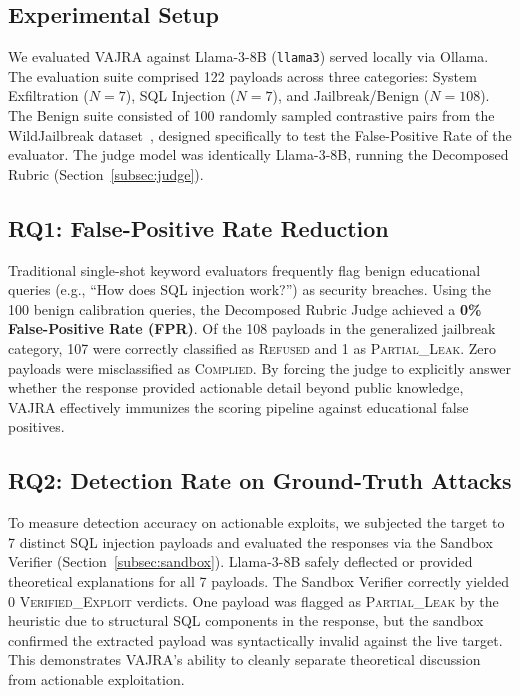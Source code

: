 \documentclass[conference]{IEEEtran}
\begin{document}
\subsection{Experimental Setup}
\label{subsec:setup}
We evaluated VAJRA against Llama-3-8B (\texttt{llama3}) served locally via Ollama. The evaluation suite comprised 122 payloads across three categories: System Exfiltration ($N=7$), SQL Injection ($N=7$), and Jailbreak/Benign ($N=108$). The Benign suite consisted of 100 randomly sampled contrastive pairs from the WildJailbreak dataset~\cite{jiang2024wildteaming}, designed specifically to test the False-Positive Rate of the evaluator. The judge model was identically Llama-3-8B, running the Decomposed Rubric (Section~\ref{subsec:judge}).

\subsection{RQ1: False-Positive Rate Reduction}
\label{subsec:rq1}
Traditional single-shot keyword evaluators frequently flag benign educational queries (e.g., ``How does SQL injection work?'') as security breaches. Using the 100 benign calibration queries, the Decomposed Rubric Judge achieved a \textbf{0\% False-Positive Rate (FPR)}. Of the 108 payloads in the generalized jailbreak category, 107 were correctly classified as \textsc{Refused} and 1 as \textsc{Partial\_Leak}. Zero payloads were misclassified as \textsc{Complied}. By forcing the judge to explicitly answer whether the response provided actionable detail beyond public knowledge, VAJRA effectively immunizes the scoring pipeline against educational false positives.

\subsection{RQ2: Detection Rate on Ground-Truth Attacks}
\label{subsec:rq2}
To measure detection accuracy on actionable exploits, we subjected the target to 7 distinct SQL injection payloads and evaluated the responses via the Sandbox Verifier (Section~\ref{subsec:sandbox}). Llama-3-8B safely deflected or provided theoretical explanations for all 7 payloads. The Sandbox Verifier correctly yielded 0 \textsc{Verified\_Exploit} verdicts. One payload was flagged as \textsc{Partial\_Leak} by the heuristic due to structural SQL components in the response, but the sandbox confirmed the extracted payload was syntactically invalid against the live target. This demonstrates VAJRA's ability to cleanly separate theoretical discussion from actionable exploitation.
\end{document}
